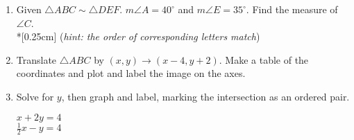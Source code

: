 \documentclass[12pt, twoside]{article}
\begin{document}
\begin{enumerate}
    \item Given $\triangle ABC \sim \triangle DEF$. $m\angle A = 40^\circ$ and $m\angle E = 35^\circ$. Find the measure of $\angle C$. \\*[0.25cm] (\emph{hint: the order of corresponding letters match}) \vspace{2.5cm}

    \item Translate $\triangle ABC$ by $(x,y) \rightarrow (x-4, y+2)$. Make a table of the coordinates and plot and label the image on the axes.
    \begin{flushright}
    \end{flushright}
 
\newpage
\item Solve for $y$, then graph and label, marking the intersection as an ordered pair.
        \vspace{0.25cm}
        \begin{multicols}{2}
          $x + 2y =  4$\\
          $\displaystyle \frac{1}{2} x -y = 4$
        \end{multicols}
        \vspace{4cm}

    \begin{center} %
    \end{center}

\newpage


\end{enumerate}
\end{document}
